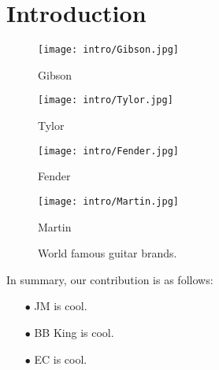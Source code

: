 \section{Introduction}
\label{sec:Intro}
\limsum[3-5]
\begin{figure*}[htbp]
	\centering
	\begin{minipage}{0.24\linewidth}
		\vspace{4pt}
		\centerline{\texttt{[image: intro/Gibson.jpg]}}
        \centerline{Gibson} 
	\end{minipage}
	\begin{minipage}{0.24\linewidth}
		\vspace{4pt}
		\centerline{\texttt{[image: intro/Tylor.jpg]}}
		\centerline{Tylor}
	\end{minipage}
	\begin{minipage}{0.24\linewidth}
		\vspace{4pt}
		\centerline{\texttt{[image: intro/Fender.jpg]}}
		\centerline{Fender}
	\end{minipage}
    \begin{minipage}{0.24\linewidth}
		\vspace{4pt}
		\centerline{\texttt{[image: intro/Martin.jpg]}}
		\centerline{Martin}
	\end{minipage}
	\caption{World famous guitar brands.}
	\label{fig.0}
\end{figure*}

\lipsum[7-8]


In summary, our contribution is as follows:
\begin{enumerate}
 \item[$\bullet$] JM is cool. 
 \item[$\bullet$] BB King is cool. 
 \item[$\bullet$] EC is cool. 
\end{enumerate}
